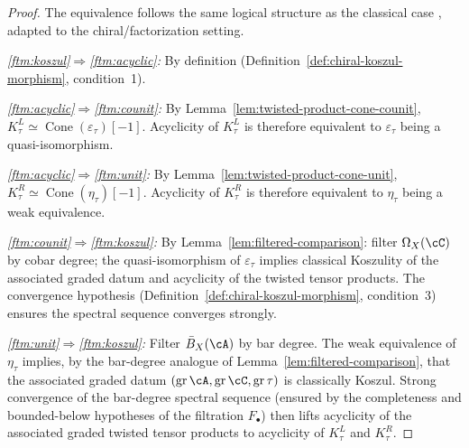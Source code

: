 \begin{proof}
The equivalence follows the same logical structure as the
classical case \cite[Theorem~2.3.1]{LV12}, adapted to the
chiral/factorization setting.

\emph{\ref{ftm:koszul}$\Rightarrow$\ref{ftm:acyclic}:}
By definition (Definition~\ref{def:chiral-koszul-morphism},
condition~1).

\emph{\ref{ftm:acyclic}$\Rightarrow$\ref{ftm:counit}:}
By Lemma~\ref{lem:twisted-product-cone-counit},
$K_\tau^L \simeq \operatorname{Cone}(\varepsilon_\tau)[-1]$.
Acyclicity of $K_\tau^L$ is therefore equivalent to
$\varepsilon_\tau$ being a quasi-isomorphism.

\emph{\ref{ftm:acyclic}$\Rightarrow$\ref{ftm:unit}:}
By Lemma~\ref{lem:twisted-product-cone-unit},
$K_\tau^R \simeq \operatorname{Cone}(\eta_\tau)[-1]$.
Acyclicity of $K_\tau^R$ is therefore equivalent to
$\eta_\tau$ being a weak equivalence.

\emph{\ref{ftm:counit}$\Rightarrow$\ref{ftm:koszul}:}
By Lemma~\ref{lem:filtered-comparison}: filter $\Omega_X(\cC)$
by cobar degree; the quasi-isomorphism of $\varepsilon_\tau$
implies classical Koszulity of the associated graded datum and
acyclicity of the twisted tensor products.  The convergence
hypothesis (Definition~\ref{def:chiral-koszul-morphism},
condition~3) ensures the spectral sequence converges strongly.

\emph{\ref{ftm:unit}$\Rightarrow$\ref{ftm:koszul}:}
Filter $\bar{B}_X(\cA)$ by bar degree.  The weak equivalence
of $\eta_\tau$ implies, by the bar-degree analogue of
Lemma~\ref{lem:filtered-comparison}, that the associated graded
datum $(\operatorname{gr} \cA, \operatorname{gr} \cC,
\operatorname{gr} \tau)$ is classically Koszul.  Strong
convergence of the bar-degree spectral sequence (ensured by the
completeness and bounded-below hypotheses of the filtration
$F_\bullet$) then lifts acyclicity of the associated graded
twisted tensor products to acyclicity of $K_\tau^L$ and
$K_\tau^R$.

\end{proof}

